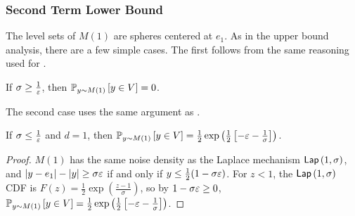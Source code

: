 \subsubsection{Second Term Lower Bound}
\label{subsubsec:lb}
The level sets of $M(1)$ are spheres centered at $e_1$. As in the upper bound analysis, there are a few simple cases. The first follows from the same reasoning used for .
\begin{corollary}
\label{cor:large_sigma_lb}
    If $\sigma \geq \frac{1}{\eps}$, then $\P{y \sim M(1)}{y \in V} = 0$.
\end{corollary}
The second case uses the same argument as .
\begin{lemma}
\label{lem:one_dim_lb}
    If $\sigma \leq \frac{1}{\eps}$ and $d = 1$, then $\P{y \sim M(1)}{y \in V} = \frac{1}{2}\exp\left(\frac{1}{2}\left[-\eps - \frac{1}{\sigma}\right]\right)$.
\end{lemma}
\begin{proof}
    $M(1)$ has the same noise density as the Laplace mechanism $\lap{1,\sigma}$, and $|y-e_1| - |y| \geq \sigma \eps$ if and only if $y \leq \frac{1}{2}(1 - \sigma \eps)$. For $z < 1$, the $\lap{1, \sigma}$ CDF is $F(z) = \frac{1}{2}\exp\left(\frac{z-1}{\sigma}\right)$, so by $1 - \sigma \eps \geq 0$, $\P{y \sim M(1)}{y \in V} = \frac{1}{2}\exp\left(\frac{1}{2}\left[-\eps - \frac{1}{\sigma}\right]\right)$.
\end{proof}
